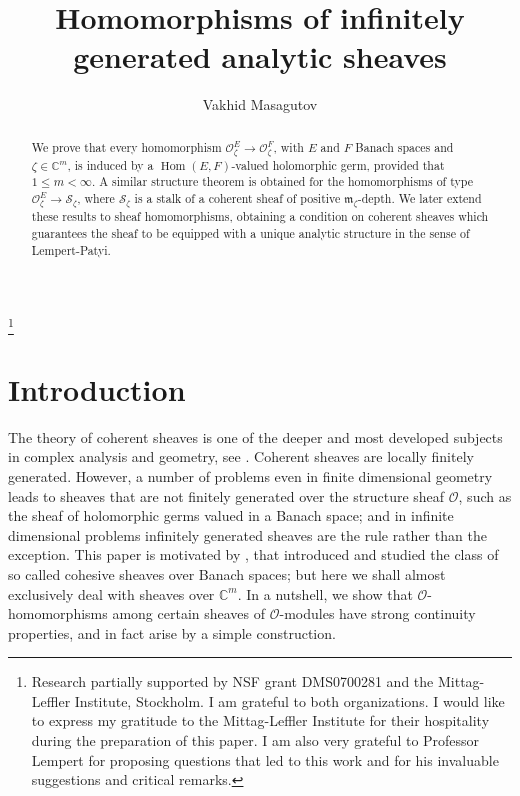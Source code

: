 \documentclass{amsart}
\numberwithin{equation}{section}
\theoremstyle{definition}
\theoremstyle{plain}
\theoremstyle{remark}
\begin{document}
\title{Homomorphisms of infinitely generated analytic sheaves}

\author{Vakhid Masagutov}
\address{
	Department of Mathematics, Purdue University \\
	West Lafayette, IN 47907, USA
	}

\thanks{
Research partially supported by NSF grant DMS0700281
and the Mittag-Leffler Institute, Stockholm. I am grateful to both
organizations.  I would like to express my gratitude to the 
Mittag-Leffler Institute for their hospitality during the preparation of this paper. 
I am also very grateful to Professor Lempert
for proposing questions that led to this work and for his
invaluable suggestions and critical remarks. 
}

\begin{abstract}
We prove that every homomorphism 
$\mathcal{O}^E_\zeta\rightarrow\mathcal{O}^F_\zeta$, 
with $E$ and $F$ Banach spaces and $\zeta\in\mathbb{C}^m$, is induced 
by a $\mathop{\mathrm{Hom}}(E,F)$-valued holomorphic germ, provided that $1\leq m<\infty$. 
A similar 
structure theorem is obtained for the homomorphisms
of type $\mathcal{O}^E_\zeta\rightarrow\mathcal{S}_\zeta$, where $\mathcal{S}_\zeta$ is
a stalk of a coherent sheaf of positive 
$\mathfrak{m}_\zeta$-depth.
We later extend these results to sheaf homomorphisms,
 obtaining a  condition on coherent sheaves
 which guarantees the sheaf to be equipped with a unique analytic structure in the sense of Lempert-Patyi.
\end{abstract}


\maketitle

\section{Introduction}
The theory of coherent sheaves is one of the deeper and most developed subjects
 in complex analysis and geometry, see \cite{GR}.
Coherent sheaves are locally finitely generated. However,
a number of problems even in finite dimensional geometry leads to sheaves
that are not finitely generated over the structure sheaf ${\ensuremath{\mathcal{{O}}}}$,
such as the sheaf of holomorphic germs valued in a Banach space;
and in infinite dimensional problems infinitely generated sheaves are the rule rather
than the exception. This paper is motivated by \cite{LP},
that introduced and studied the class of
so called cohesive sheaves over Banach spaces; but here we shall almost exclusively
deal with sheaves over $\mathbb{C}^m$. In a nutshell, we show that 
{\ensuremath{\mathcal{{O}}}}-homomorphisms among certain sheaves of {\ensuremath{\mathcal{{O}}}}-modules
have strong continuity properties, and in fact arise by a simple construction.
\end{document}
